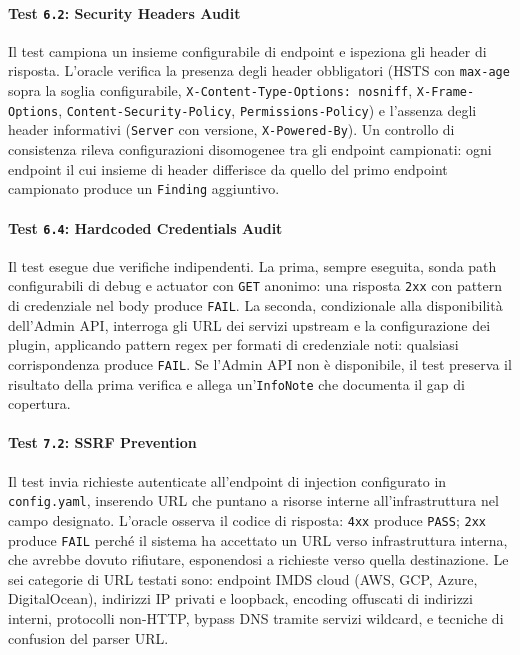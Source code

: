 \paragraph{Test \texttt{6.2}: Security Headers Audit}
Il test campiona un insieme configurabile di endpoint e ispeziona gli header di risposta. L'oracle verifica la presenza degli header obbligatori (\gls{HSTS} con \texttt{max-age} sopra la soglia configurabile, \texttt{X-Content-Type-Options: nosniff}, \texttt{X-Frame-Options}, \texttt{Content-Security-Policy}, \texttt{Permissions-Policy}) e l'assenza degli header informativi (\texttt{Server} con versione, \texttt{X-Powered-By}). Un controllo di consistenza rileva configurazioni disomogenee tra gli endpoint campionati: ogni endpoint il cui insieme di header differisce da quello del primo endpoint campionato produce un \texttt{Finding} aggiuntivo.

\paragraph{Test \texttt{6.4}: Hardcoded Credentials Audit}
Il test esegue due verifiche indipendenti. La prima, sempre eseguita, sonda path configurabili di debug e actuator con \texttt{GET} anonimo: una risposta \texttt{2xx} con pattern di credenziale nel body produce \texttt{FAIL}. La seconda, condizionale alla disponibilità dell'Admin \gls{API}, interroga gli \gls{URL} dei servizi upstream e la configurazione dei plugin, applicando pattern regex per formati di credenziale noti: qualsiasi corrispondenza produce \texttt{FAIL}. Se l'Admin \gls{API} non è disponibile, il test preserva il risultato della prima verifica e allega un'\texttt{InfoNote} che documenta il gap di copertura.

\paragraph{Test \texttt{7.2}: SSRF Prevention}
Il test invia richieste autenticate all'endpoint di injection configurato in \texttt{config.yaml}, inserendo \gls{URL} che puntano a risorse interne all'infrastruttura nel campo designato. L'oracle osserva il codice di risposta: \texttt{4xx} produce \texttt{PASS}; \texttt{2xx} produce \texttt{FAIL} perché il sistema ha accettato un \gls{URL} verso infrastruttura interna, che avrebbe dovuto rifiutare, esponendosi a richieste verso quella destinazione.
Le sei categorie di \gls{URL} testati sono: endpoint \gls{IMDS} cloud (AWS, GCP, Azure, DigitalOcean), indirizzi IP privati e loopback, encoding offuscati di indirizzi interni, protocolli non-\gls{HTTP}, bypass \gls{DNS} tramite servizi wildcard, e tecniche di confusion del parser \gls{URL}.



